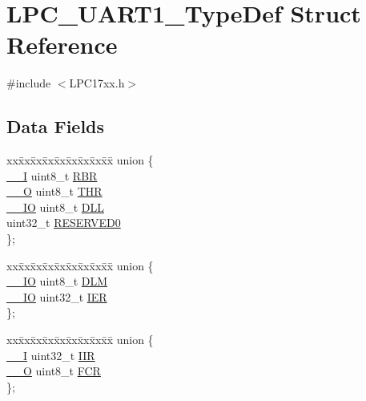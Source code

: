 \hypertarget{structLPC__UART1__TypeDef}{}\section{L\+P\+C\+\_\+\+U\+A\+R\+T1\+\_\+\+Type\+Def Struct Reference}
\label{structLPC__UART1__TypeDef}


{\ttfamily \#include $<$L\+P\+C17xx.\+h$>$}

\subsection*{Data Fields}
\begin{DoxyCompactItemize}
\item 
\begin{tabbing}
xx\=xx\=xx\=xx\=xx\=xx\=xx\=xx\=xx\=\kill
union \{\\
\>\hyperlink{LPC17xx_8h_af63697ed9952cc71e1225efe205f6cd3}{\_\_I} uint8\_t \hyperlink{structLPC__UART1__TypeDef_ae6e1a8c9fc74cabf8dcb1e4bdd65a8bf}{RBR}\\
\>\hyperlink{LPC17xx_8h_a7e25d9380f9ef903923964322e71f2f6}{\_\_O} uint8\_t \hyperlink{structLPC__UART1__TypeDef_a12e9a213fd67c6bed7ba73d8e811ea3a}{THR}\\
\>\hyperlink{LPC17xx_8h_aec43007d9998a0a0e01faede4133d6be}{\_\_IO} uint8\_t \hyperlink{structLPC__UART1__TypeDef_ae7ba7dce82162c6ad1eeb482f7c6549a}{DLL}\\
\>uint32\_t \hyperlink{structLPC__UART1__TypeDef_a0cccc07f3e2c9d1f04df27f14fdc6d1a}{RESERVED0}\\
\}; \\

\end{tabbing}\item 
\begin{tabbing}
xx\=xx\=xx\=xx\=xx\=xx\=xx\=xx\=xx\=\kill
union \{\\
\>\hyperlink{LPC17xx_8h_aec43007d9998a0a0e01faede4133d6be}{\_\_IO} uint8\_t \hyperlink{structLPC__UART1__TypeDef_a7e46410709fd9acce54a3e05aad2d500}{DLM}\\
\>\hyperlink{LPC17xx_8h_aec43007d9998a0a0e01faede4133d6be}{\_\_IO} uint32\_t \hyperlink{structLPC__UART1__TypeDef_adee06096826ff2cfc53d2a063a2d7f8c}{IER}\\
\}; \\

\end{tabbing}\item 
\begin{tabbing}
xx\=xx\=xx\=xx\=xx\=xx\=xx\=xx\=xx\=\kill
union \{\\
\>\hyperlink{LPC17xx_8h_af63697ed9952cc71e1225efe205f6cd3}{\_\_I} uint32\_t \hyperlink{structLPC__UART1__TypeDef_a26e339a178cd598a5b7ab18eb0201c0b}{IIR}\\
\>\hyperlink{LPC17xx_8h_a7e25d9380f9ef903923964322e71f2f6}{\_\_O} uint8\_t \hyperlink{structLPC__UART1__TypeDef_a73b3a5a2f1ec5f5691bfc681dc88facf}{FCR}\\
\}; \\


\end{tabbing}
\end{DoxyCompactItemize}
